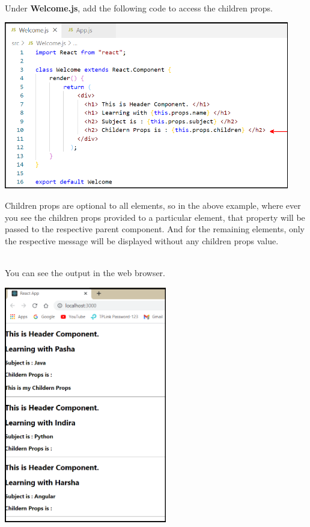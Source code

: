 \documentclass{article}
\begin{document}
\noindent 

\noindent \\
Under \textbf{Welcome.js}, add the following code to access the children props.

\begin{center}
	\noindent \includegraphics*[width=4.91in, height=2.88in]{IMG-08-19}
\end{center}

\noindent 
\newpage
\noindent 
Children props are optional to all elements, so in the above example, where ever you see the children props provided to a particular element, that property will be passed to the respective parent component. And for the remaining elements, only the respective message will be displayed without any children props value.

\noindent 

\noindent 

\noindent 

\noindent 

\noindent \\
You can see the output in the web browser.

\begin{center}
	\noindent \includegraphics*[width=2.79in, height=4.07in]{IMG-08-20}
\end{center}
\end{document}
